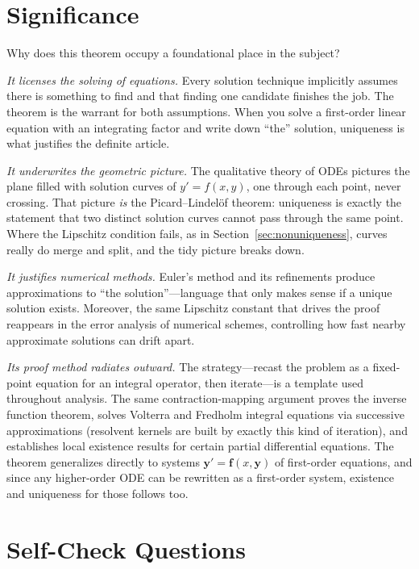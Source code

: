\documentclass{essay}
\begin{document}
\section{Significance}

Why does this theorem occupy a foundational place in the subject?

\emph{It licenses the solving of equations.} Every solution technique implicitly assumes there is something to find and that finding one candidate finishes the job. The theorem is the warrant for both assumptions. When you solve a first-order linear equation with an integrating factor and write down ``the'' solution, uniqueness is what justifies the definite article.

\emph{It underwrites the geometric picture.} The qualitative theory of ODEs pictures the plane filled with solution curves of $y' = f(x,y)$, one through each point, never crossing. That picture \emph{is} the Picard--Lindel\"of theorem: uniqueness is exactly the statement that two distinct solution curves cannot pass through the same point. Where the Lipschitz condition fails, as in Section~\ref{sec:nonuniqueness}, curves really do merge and split, and the tidy picture breaks down.

\emph{It justifies numerical methods.} Euler's method and its refinements produce approximations to ``the solution''---language that only makes sense if a unique solution exists. Moreover, the same Lipschitz constant that drives the proof reappears in the error analysis of numerical schemes, controlling how fast nearby approximate solutions can drift apart.

\emph{Its proof method radiates outward.} The strategy---recast the problem as a fixed-point equation for an integral operator, then iterate---is a template used throughout analysis. The same contraction-mapping argument proves the inverse function theorem, solves Volterra and Fredholm integral equations via successive approximations (resolvent kernels are built by exactly this kind of iteration), and establishes local existence results for certain partial differential equations. The theorem generalizes directly to systems $\mathbf{y}' = \mathbf{f}(x, \mathbf{y})$ of first-order equations, and since any higher-order ODE can be rewritten as a first-order system, existence and uniqueness for those follows too.

\section{Self-Check Questions}
\end{document}
